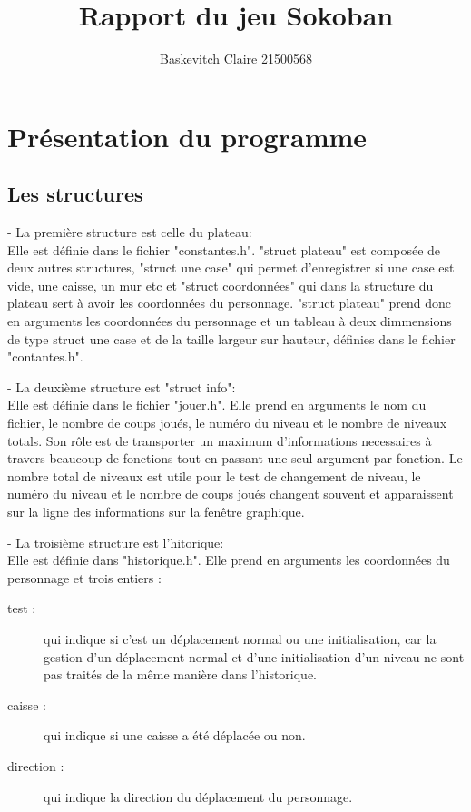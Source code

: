 \documentclass{report}
\title{\textbf{\huge Rapport du jeu Sokoban}}
\author{Baskevitch Claire 21500568}
\begin{document}
\maketitle


\part{Présentation du programme}
	\chapter{Les structures}
- La première structure est celle du plateau:\\
Elle est définie dans le fichier "constantes.h".
"struct plateau" est composée de deux autres structures, "struct une case" qui permet d'enregistrer si une case est vide, une caisse, un mur etc et "struct coordonnées" qui dans la structure du plateau sert à avoir les coordonnées du personnage.
"struct plateau" prend donc en arguments les coordonnées du personnage et un tableau à deux dimmensions de type struct une case et de la taille largeur sur hauteur, définies dans le fichier "contantes.h".

- La deuxième structure est "struct info":\\
Elle est définie dans le fichier "jouer.h".
Elle prend en arguments le nom du fichier, le nombre de coups joués, le numéro du niveau et le nombre de niveaux totals. Son rôle est de transporter un maximum d'informations necessaires à travers beaucoup de fonctions tout en passant une seul argument par fonction. Le nombre total de niveaux est utile pour le test de changement de niveau, le numéro du niveau et le nombre de coups joués changent souvent et apparaissent sur la ligne des informations sur la fenêtre graphique.

- La troisième structure est l'hitorique:\\
Elle est définie dans "historique.h".
Elle prend en arguments les coordonnées du personnage et trois entiers :
\begin{description}
\item[test :]qui indique si c'est un déplacement normal ou une initialisation, car la gestion d'un déplacement normal et d'une initialisation d'un niveau ne sont pas traités de la même manière dans l'historique.
\item[caisse :]qui indique si une caisse a été déplacée ou non.
\item[direction :]qui indique la direction du déplacement du personnage.
\end{description}
\end{document}
